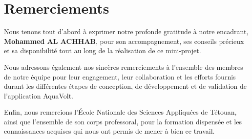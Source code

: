 
\chapter*{Remerciements}

Nous tenons tout d'abord à exprimer notre profonde gratitude à notre encadrant, \textbf{Mohammed AL ACHHAB}, pour son accompagnement, ses conseils précieux et sa disponibilité tout au long de la réalisation de ce mini-projet.

Nous adressons également nos sincères remerciements à l'ensemble des membres de notre équipe pour leur engagement, leur collaboration et les efforts fournis durant les différentes étapes de conception, de développement et de validation de l'application AquaVolt.

Enfin, nous remercions l'École Nationale des Sciences Appliquées de Tétouan, ainsi que l'ensemble de son corps professoral, pour la formation dispensée et les connaissances acquises qui nous ont permis de mener à bien ce travail.